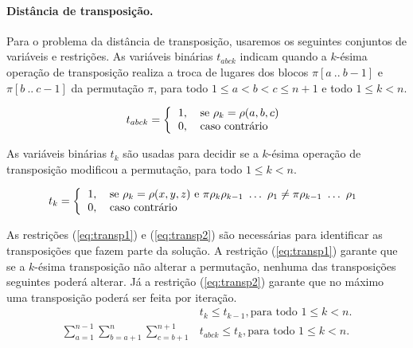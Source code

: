 \paragraph{Distância de transposição.}
Para o problema da distância de transposição, usaremos os seguintes
conjuntos de variáveis e restrições. As variáveis binárias $t_{abck}$
indicam quando a $k$-ésima operação de transposição realiza a troca de
lugares dos blocos $\pi[a~..~b - 1]$ e $\pi[b~..~c - 1]$ da permutação
$\pi$, para todo $1 \le a < b < c \le n + 1$ e todo $ 1 \le k < n$.

\[ 
  t_{abck} = \left \{ 
  \begin{tabular}{ll} 
  1, & se $\rho_{k} = \rho(a,b,c)$ \\ 
  0, & caso contrário 
  \end{tabular} \right .
\] 

As variáveis binárias $t_{k}$ são usadas para decidir se a $k$-ésima
operação de transposição modificou a permutação, para todo $ 1 \le k <
n$.

\[ 
  t_{k} = \left \{ 
  \begin{tabular}{ll} 
  1, & se $\rho_{k} = \rho(x,y,z)$ e
  $\pi \rho_{k} \rho_{k-1}~\ldots~\rho_{1} \neq \pi \rho_{k-1}~\ldots~\rho_{1}$\\
  0, & caso contrário 
  \end{tabular} \right .
\]

As restrições (\ref{eq:transp1}) e (\ref{eq:transp2}) são necessárias
para identificar as transposições que fazem parte da solução. A
restrição (\ref{eq:transp1}) garante que se a $k$-ésima transposição não
alterar a permutação, nenhuma das transposições seguintes poderá
alterar. Já a restrição (\ref{eq:transp2}) garante que no máximo uma
transposição poderá ser feita por iteração.
\begin{align}
  &t_{k} \le t_{k-1}, \text{para todo $1 \le k <
  n$}. \label{eq:transp1} \\
  \sum_{a=1}^{n-1}\sum_{b=a+1}^{n}\sum_{c=b+1}^{n+1} &t_{abck} \le
  t_{k} , \text{para todo $1 \le k <
  n$}. \label{eq:transp2} 
\end{align}

